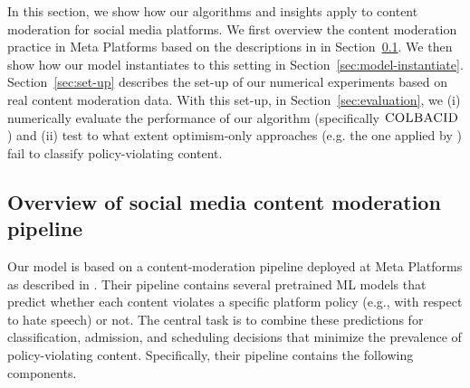 In this section, we show how our algorithms and insights apply to content moderation for social media platforms. We first overview the content moderation practice in Meta Platforms based on the descriptions in \cite{Avadhanula2022} in Section~\ref{sec:overview-practice}. We then show how our model instantiates to this setting in Section~\ref{sec:model-instantiate}. Section~\ref{sec:set-up} describes the set-up of our numerical experiments based on real content moderation data. With this set-up, in Section~\ref{sec:evaluation}, we (i) numerically evaluate the performance of our algorithm (specifically $\textsc{COLBACID}$) and (ii) test to what extent optimism-only approaches (e.g. the one applied by \cite{Avadhanula2022}) fail to classify policy-violating content.

\subsection{Overview of social media content moderation pipeline}\label{sec:overview-practice}
Our model is based on a content-moderation pipeline deployed at Meta Platforms as described in \cite{Avadhanula2022}. Their pipeline contains several pretrained ML models that predict whether each content violates a specific platform policy (e.g., with respect to hate speech) or not. The central task is to combine these predictions for classification, admission, and scheduling decisions that minimize the prevalence of policy-violating content. Specifically, their pipeline contains the following components.

